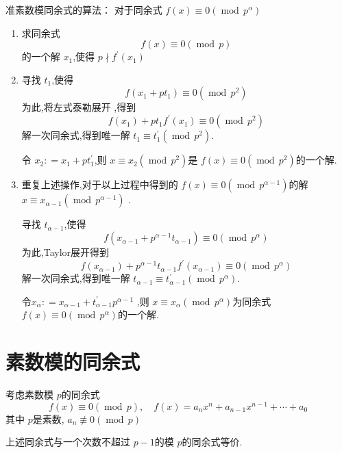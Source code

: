 \documentclass[lang=cn,12pt,color=green,fontset=none]{elegantbook}
\begin{document}
\noindent 准素数模同余式的算法：
对于同余式 \(  f\left( x \right)\equiv 0\left( \operatorname{mod}\,p^{\alpha } \right)    \) 
\begin{enumerate}
    \item 求同余式 \[
    f\left( x \right)\equiv 0\left( \operatorname{mod}\, p \right)  
    \]的一个解 \(  x_1  \),使得 \(  p \nmid f^{\prime} \left( x_1 \right)   \)  
    \item 寻找 \(  t_1  \),使得 \[
    f\left( x_1+ pt_1 \right)\equiv 0\left( \operatorname{mod}\,p^{2} \right)  
    \] 为此,将左式泰勒展开 ,得到 \[
    f\left( x_1 \right)+ pt_1f^{\prime} \left( x_1 \right)\equiv 0 \left( \operatorname{mod}\,p^{2} \right)   
    \]解一次同余式,得到唯一解 \(  t_1\equiv t_1^{\prime} \left( \operatorname{mod}\,p^{2} \right)   \). 

    令 \(  x_2: =  x_1+ pt_1^{\prime}   \),则 \(  x \equiv x_2\left( \operatorname{mod}\,p^{2} \right)   \)是 \(  f\left( x \right)\equiv 0\left( \operatorname{mod}\,p^{2} \right)    \)的一个解.   

    \item 重复上述操作,对于以上过程中得到的 \(  f\left( x \right)\equiv 0\left( \operatorname{mod}\,p^{\alpha -1} \right)    \)的解 \(  x \equiv x_{\alpha -1}  \left( \operatorname{mod}\,p^{\alpha -1} \right) \)  .
    
    寻找 \(  t_{\alpha -1}  \),使得 \[
    f\left( x_{\alpha -1}+ p^{ \alpha -1}t_{ \alpha -1} \right)\equiv 0\left( \operatorname{mod}\,p^{ \alpha } \right)  
    \] 为此,Taylor展开得到 \[
    f\left( x_{\alpha -1} \right)+ p^{ \alpha -1}t_{ \alpha -1}f^{\prime} \left( x_{ \alpha -1} \right)  \equiv  0\left( \operatorname{mod}\,p^{ \alpha } \right) 
    \]解一次同余式,得到唯一解 \(  t_{ \alpha -1}\equiv t_{ \alpha -1}^{\prime} \left( \operatorname{mod}\,p^{ \alpha } \right)   \). 
    
    令\(  x_{ \alpha }: =  x_{ \alpha -1}+ t ^{\prime} _{ \alpha -1} p^{ \alpha -1}  \) ,则 \(  x \equiv x_{ \alpha }\left( \operatorname{mod}\,p^{ \alpha } \right)   \)为同余式 \(  f\left( x \right)\equiv 0   \left( \operatorname{mod}\,p^{ \alpha } \right) \)的一个解.
 
\end{enumerate}
\section{素数模的同余式}
考虑素数模 \(  p  \)的同余式 \[
f\left( x \right)\equiv 0\left( \operatorname{mod}\,p \right),\quad f\left( x \right)= a_{n}x^{n}+ a_{n-1}x^{n-1}+ \cdots + a_0   
\] 其中 \(  p  \)是素数, \(  a_{n } \not \equiv 0\left( \operatorname{mod}\,p \right)   \)  
\begin{theorem}
    上述同余式与一个次数不超过 \(  p-1  \)的模 \(  p  \)的同余式等价.  
\end{theorem}
\end{document}
